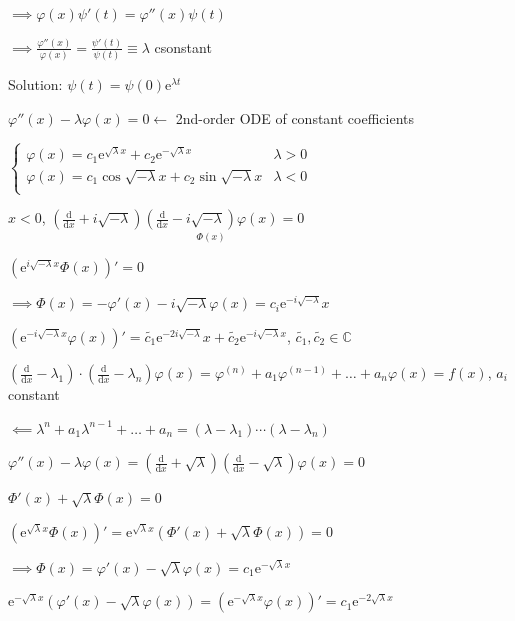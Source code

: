 $\implies\varphi(x)\psi'(t)=\varphi''(x)\psi(t)$

$\implies\frac{\varphi''(x)}{\varphi(x)}=\frac{\psi'(t)}{\psi(t)}\equiv\lambda$ csonstant

Solution: $\psi(t)=\psi(0)\mathrm{e}^{\lambda t}$

$\varphi''(x)-\lambda\varphi(x)=0\leftarrow$ 2nd-order ODE of constant coefficients

$\begin{cases}
        \varphi(x)=c_1\mathrm{e}^{\sqrt{\lambda}x}+c_2\mathrm{e}^{-\sqrt{\lambda}x} & \lambda>0 \\
        \varphi(x)=c_1\cos\sqrt{-\lambda}x+c_2\sin\sqrt{-\lambda}x                  & \lambda<0 \\
    \end{cases}$

$x<0$, $\left(\frac{\mathrm{d}}{\mathrm{d}x}+i\sqrt{-\lambda}\right)\underset{\Phi(x)}{\left(\frac{\mathrm{d}}{\mathrm{d}x}-i\sqrt{-\lambda}\right)\varphi(x)}=0$

$\left(\mathrm{e}^{i\sqrt{-\lambda}x}\Phi(x)\right)'=0$

$\implies\Phi(x)=-\varphi'(x)-i\sqrt{-\lambda}\varphi(x)=c_i\mathrm{e}^{-i\sqrt{-\lambda}}x$

$\left(\mathrm{e}^{-i\sqrt{-\lambda}x}\varphi(x)\right)'=\tilde{c_1}\mathrm{e}^{-2i\sqrt{-\lambda}}x+\tilde{c_2}\mathrm{e}^{-i\sqrt{-\lambda}x}$, $\tilde{c_1},\tilde{c_2}\in\mathbb{C}$

$\left(\frac{\mathrm{d}}{\mathrm{d}x}-\lambda_1\right)\cdot\left(\frac{\mathrm{d}}{\mathrm{d}x}-\lambda_n\right)\varphi(x)=\varphi^{(n)}+a_1\varphi^{(n-1)}+\dots+a_n\varphi(x)=f(x)$, $a_i$ constant

$\impliedby\lambda^n+a_1\lambda^{n-1}+\dots+a_n=(\lambda-\lambda_1)\cdots(\lambda-\lambda_n)$

$\varphi''(x)-\lambda\varphi(x)=\left(\frac{\mathrm{d}}{\mathrm{d}x}+\sqrt{\lambda}\right)\left(\frac{\mathrm{d}}{\mathrm{d}x}-\sqrt{\lambda}\right)\varphi(x)=0$

$\Phi'(x)+\sqrt{\lambda}\Phi(x)=0$

$\left(\mathrm{e}^{\sqrt{\lambda}x}\Phi(x)\right)'=\mathrm{e}^{\sqrt{\lambda}x}\left(\Phi'(x)+\sqrt{\lambda}\Phi(x)\right)=0$

$\implies\Phi(x)=\varphi'(x)-\sqrt{\lambda}\varphi(x)=c_1\mathrm{e}^{-\sqrt{\lambda}x}$

$\mathrm{e}^{-\sqrt{\lambda}x}\left(\varphi'(x)-\sqrt{\lambda}\varphi(x)\right)=\left(\mathrm{e}^{-\sqrt{\lambda}x}\varphi(x)\right)'=c_1\mathrm{e}^{-2\sqrt{\lambda}x}$

